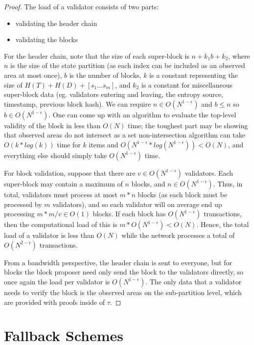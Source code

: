 \documentclass[11pt,a4paper]{report}
\theoremstyle{plain}
\theoremstyle{definition}
\theoremstyle{remark}
\begin{document}
\begin{proof}
The load of a validator consists of two parts:

\begin{itemize}
\item
validating the header chain
\item
validating the blocks
\end{itemize}

For the header chain, note that the size of each super-block is $n+k_1b+k_2$, where $n$ is the size of the state partition (as each index can be included as an observed area at most once), $b$ is the number of blocks, $k$ is a constant representing the size of $H(T) + H(D) + [s_1 ... s_m]$, and $k_2$ is a constant for miscellaneous super-block data (eg. validators entering and leaving, the entropy source, timestamp, previous block hash). We can require $n \in O(N^{1-\epsilon})$ and $b \le n$ so $b \in O(N^{1-\epsilon})$. One can come up with an algorithm to evaluate the top-level validity of the block in less than $O(N)$ time; the toughest part may be showing that observed areas do not intersect as a set non-intersection algorithm can take $O(k*log(k))$ time for $k$ items and $O(N^{1-\epsilon} * log(N^{1-\epsilon})) < O(N)$, and everything else should simply take $O(N^{1-\epsilon})$ time.

For block validation, suppose that there are $v \in O(N^{1-\epsilon})$ validators. Each super-block may contain a maximum of $n$ blocks, and $n \in O(N^{1-\epsilon})$. Thus, in total, validators must process at most $m*n$ blocks (as each block must be processed by $m$ validators), and so each validator will on average end up processing $m*m/v \in O(1)$ blocks. If each block has $O(N^{1-\epsilon})$ transactions, then the computational load of this is $m * O(N^{1-\epsilon}) < O(N)$. Hence, the total load of a validator is less than $O(N)$ while the network processes a total of $O(N^{2-\epsilon})$ transactions.

From a bandwidth perspective, the header chain is sent to everyone, but for blocks the block proposer need only send the block to the validators directly, so once again the load per validator is $O(N^{1-\epsilon})$. The only data that a validator needs to verify the block is the observed areas on the sub-partition level, which are provided with proofs inside of $\tau$.
\end{proof}

\chapter{Fallback Schemes}
\end{document}
